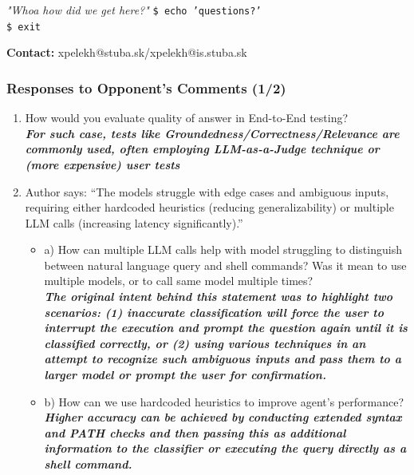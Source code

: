 \documentclass[10pt,aspectratio=169]{beamer}
\begin{document}
\begin{frame}
    \begin{center}
        \begin{exampleblock}{\textit{"Whoa how did we get here?"}}
            \texttt{\$ echo 'questions?'}\\
            \texttt{\$ exit}
        \end{exampleblock}
        \vspace{0.8cm}
        \textbf{Contact:} xpelekh@stuba.sk/xpelekh@is.stuba.sk
    \end{center}
\end{frame}

\appendix
\begin{frame}
    \frametitle{Responses to Opponent's Comments (1/2)}
    \footnotesize
    \begin{enumerate}
        \item How would you evaluate quality of answer in End-to-End testing?\\
            \textsl{\textbf{For such case, tests like
            Groundedness/Correctness/Relevance are commonly used, often
            employing LLM-as-a-Judge
            technique or (more expensive) user tests}}
        \item Author says: ``The models struggle with edge cases and ambiguous
            inputs, requiring either hardcoded heuristics (reducing
            generalizability) or multiple LLM calls (increasing latency
            significantly).''
            \begin{itemize}
                \item a) How can multiple LLM calls help with model struggling
                    to distinguish between natural language query and shell
                    commands? Was it mean to use multiple models, or to call
                    same model multiple times?\\
                    \textsl{\textbf{The original intent behind this statement
                    was to highlight two scenarios:
                    (1) inaccurate classification will force the user to
                    interrupt the execution and prompt the question again until
                    it is classified correctly, or (2) using various techniques
                    in an attempt to recognize such ambiguous inputs and pass
                    them to a larger model or prompt the user for
                    confirmation.}}
                \item b) How can we use hardcoded heuristics to improve agent’s
                    performance?\\
                    \textsl{\textbf{Higher accuracy can be achieved by
                    conducting extended syntax and PATH checks and then passing
                    this as additional information to the classifier or
                    executing the query directly as a shell command.}}
            \end{itemize}
    \end{enumerate}
\end{frame}
\end{document}
